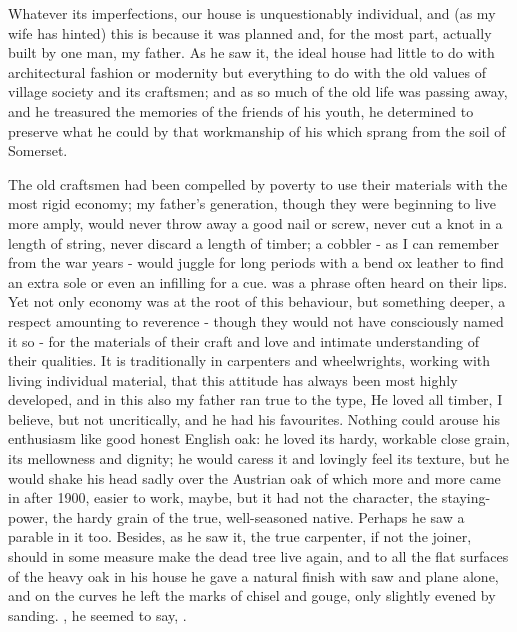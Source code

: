 
Whatever its imperfections, our house is unquestionably individual, and (as my wife has hinted) this is because it was planned and, for the most part, actually built by one man, my father. As he saw it, the ideal house had little to do with architectural fashion or modernity but everything to do with the old values of village society and its craftsmen; and as so much of the old life was passing away, and he treasured the memories of the friends of his youth, he determined to preserve what he could by that workmanship of his which sprang from the soil of Somerset.

The old craftsmen had been compelled by poverty to use their materials with the most rigid economy; my father's generation, though they were beginning to live more amply, would never throw away a good nail or screw, never cut a knot in a length of string, never discard a length of timber; a cobbler - as I can remember from the war years - would juggle for long periods with a bend ox leather to find an extra sole or even an infilling for a cue.  was a phrase often heard on their lips. Yet not only economy was at the root of this behaviour, but something deeper, a respect amounting to reverence - though they would not have consciously named it so - for the materials of their craft and love and intimate understanding of their qualities. It is traditionally in carpenters and wheelwrights, working with living individual material, that this attitude has always been most highly developed, and in this also my father ran true to the type, He loved all timber, I believe, but not uncritically, and he had his favourites. Nothing could arouse his enthusiasm like good honest English oak: he loved its hardy, workable close grain, its mellowness and dignity; he would caress it and lovingly feel its texture, but he would shake his head sadly over the Austrian oak of which more and more came in after 1900, easier to work, maybe, but it had not the character, the staying-power, the hardy grain of the true, well-seasoned native. Perhaps he saw a parable in it too. Besides, as he saw it, the true carpenter, if not the joiner, should in some measure make the dead tree live again, and to all the flat surfaces of the heavy oak in his house he gave a natural finish with saw and plane alone, and on the curves he left the marks of chisel and gouge, only slightly evened by sanding. , he seemed to say, .

